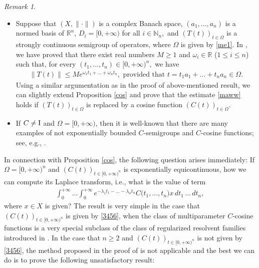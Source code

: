\documentclass{amsart}
\theoremstyle{definition}
\theoremstyle{remark}
\newtheorem{rem}[thm]{Remark}
\numberwithin{equation}{section}
\begin{document}
\begin{rem}\label{renik}
\begin{itemize}
\item[(i)] Suppose that $(X,\| \cdot \|)$ is a complex Banach space, $(a_{1},...,a_{n})$ is a normed basis of ${\mathbb R}^{n}$, $D_{i}=[0,+\infty)$ for all $i\in {\mathbb N}_{n},$ and $(T(t))_{t\in \Omega}$ is a strongly continuous semigroup of operators, where  $\Omega$ is given by \eqref{me1}.   
In \cite[Proposition 9.1.1]{apsclcs}, we have proved that there exist real numbers $M\geq 1$ and $\omega_{i}\in {\mathbb R}$ ($1\leq i \leq n$) such that, for every $(t_{1},...,t_{n})\in [0,+\infty)^{n},$ we have
\begin{align}\label{maww}
\bigl \| T(t)\bigr\| \leq Me^{\omega_{1}t_{1}+...+\omega_{n}t_{n}},\mbox{ provided that } t=t_{1}a_{1}+...+t_{n}a_{n} \in \Omega.
\end{align}
Using a similar argumentation as in the proof of above-mentioned result, we can slightly extend Proposition \ref{cos} and prove that the estimate \eqref{maww} holds if $(T(t))_{t\in \Omega}$ is replaced by a cosine function $(C(t))_{t\in \Omega}$.
\item[(ii)] If $C\neq {\rm I} $ and $\Omega=[0,+\infty)$, then it is well-known that there are many examples of not exponentially bounded $C$-semigroups and $C$-cosine functions; see, e.g., \cite{knjiga}. 
\end{itemize}
\end{rem}

In connection with Proposition \ref{cos}, the following question arises immediately: If $\Omega=[0,+\infty)^{n}$ and $(C(t))_{t\in [0,+\infty)^{n}}$ is exponentially equicontinuous, how we can compute its Laplace transform, i.e., what is the value of term
\begin{align*}
\int^{+\infty}_{0}...\int^{+\infty}_{0}e^{-\lambda_{1}t_{1}-...-\lambda_{n}t_{n}}C\bigl(t_{1},...,t_{n}\bigr)x\, dt_{1}\, ...\, dt_{n},
\end{align*}
where $x\in X$ is given? The result is very simple in the case that $(C(t))_{t\in [0,+\infty)^{n}}$ is given by \eqref{3456}, when the class of multiparameter $C$-cosine functions is a very special subclass of the class of regularized resolvent families introduced in \cite[Definition 2.1(iii)]{aims}. 
In the case that $n\geq 2$ and $(C(t))_{t\in [0,+\infty)^{n}}$ is not given by \eqref{3456}, the method proposed in the proof of \cite[Proposition 3.14.4]{a43} is not applicable and the best we can do is to prove the following unsatisfactory result:
\end{document}

